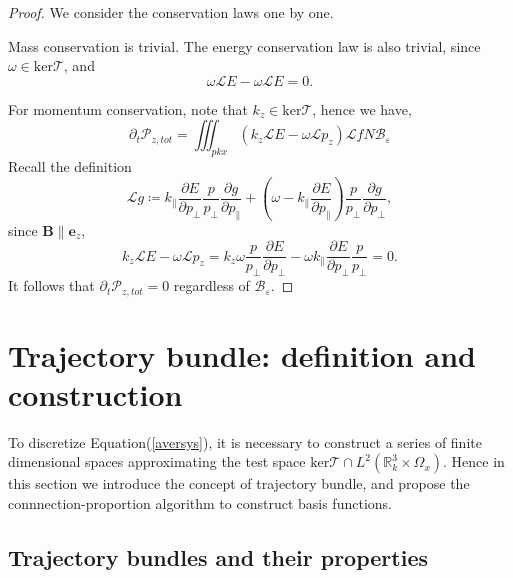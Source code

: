 \documentclass{article}
\numberwithin{equation}{section}
\begin{document}
\begin{proof}
We consider the conservation laws one by one. 

Mass conservation is trivial. The energy conservation law is also trivial, since $\omega \in \text{ker}\mathcal{T}$, and
\begin{equation*}
    \omega\mathcal{L}E-\omega\mathcal{L}E=0.
\end{equation*}

For momentum conservation, note that $k_{z}\in \text{ker}\mathcal{T}$, hence we have,
\begin{equation*}
\partial_{t}\mathcal{P}_{z,tot}=\iiint_{pkx}\left(k_{z}\mathcal{L}E-\omega\mathcal{L}p_{z}\right)\mathcal{L}fN\mathcal{B}_{\varepsilon}
\end{equation*}
Recall the definition
\begin{equation*}
\mathcal{L}g\coloneqq k_{\parallel}\frac{\partial E}{\partial p_{\perp}}\frac{p}{p_{\perp}}\frac{\partial g}{\partial p_{\parallel}}+\left(\omega-k_{\parallel}\frac{\partial E}{\partial p_{\parallel}}\right)\frac{p}{p_{\perp}}\frac{\partial g}{\partial p_{\perp}},
\end{equation*}
since $\mathbf{B} \parallel \mathbf{e}_{z}$, 
\begin{equation*}
    k_{z}\mathcal{L}E-\omega\mathcal{L}p_{z}=k_{z}\omega\frac{p}{p_{\perp}}\frac{\partial E}{\partial p_{\perp}}-\omega k_{\parallel}\frac{\partial E}{\partial p_{\perp}}\frac{p}{p_{\perp}}=0.
\end{equation*}
It follows that $\partial_{t}\mathcal{P}_{z,tot}=0$ regardless of $\mathcal{B}_{\varepsilon}$.
    
\end{proof}


\section{Trajectory bundle: definition and construction}\label{sec:trajbundle} 



To discretize Equation(\ref{aversys}), it is necessary to construct a series of finite dimensional spaces approximating the test space $\text{ker}\mathcal{T} \cap L^{2}(\mathbb{R}^{3}_{k}\times\Omega_{x})$. Hence in this section we introduce the concept of trajectory bundle, and propose the connnection-proportion algorithm to construct basis functions.

\subsection{Trajectory bundles and their properties}
\end{document}

